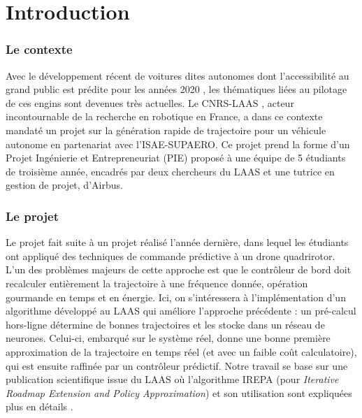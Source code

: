 \documentclass[a4paper,12pt]{report}
\begin{document}




\tableofcontents

















\newpage
\chapter*{Introduction}

\subsection*{Le contexte}
Avec le développement récent de voitures dites autonomes dont l'accessibilité au grand public est prédite pour les années 2020 \cite{autonomous_car}\cite{autonomous_car_2}, les thématiques liées au pilotage de ces engins sont devenues très actuelles. Le CNRS-LAAS \cite{laas}, acteur incontournable de la recherche en robotique en France, a dans ce contexte mandaté un projet sur la génération rapide de trajectoire pour un véhicule autonome en partenariat avec l'ISAE-SUPAERO. Ce projet prend la forme d'un Projet Ingénierie et Entrepreneuriat (PIE) proposé à une équipe de 5 étudiants de troisième année, encadrés par deux chercheurs du LAAS et une tutrice en gestion de projet, d'Airbus.


\subsection*{Le projet}
Le projet fait suite à un projet réalisé l'année dernière, dans lequel les étudiants ont appliqué des techniques de commande prédictive à un drone quadrirotor. L'un des problèmes majeurs de cette approche est que le contrôleur de bord doit recalculer entièrement la trajectoire à une fréquence donnée, opération gourmande en temps et en énergie. Ici, on s'intéressera à l'implémentation d’un algorithme développé au LAAS qui améliore l’approche précédente : un pré-calcul hors-ligne détermine de bonnes trajectoires et les stocke dans un réseau de neurones. Celui-ci, embarqué sur le système réel, donne une bonne première approximation de la trajectoire en temps réel (et avec un faible coût calculatoire), qui est ensuite raffinée par un contrôleur prédictif. Notre travail se base sur une publication scientifique issue du LAAS où l'algorithme IREPA (pour \textit{Iterative Roadmap Extension and Policy Approximation}) et son utilisation sont expliquées plus en détails \cite{mansard}.
\end{document}
